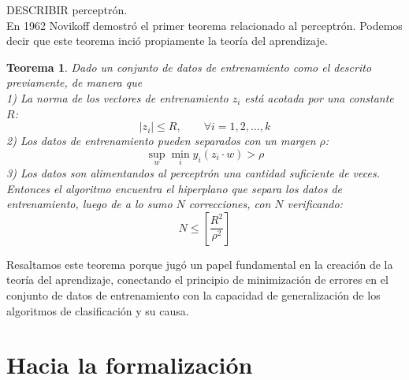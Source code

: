 \documentclass{article}
\newtheorem{thm}{Teorema}[subsection]
\begin{document}
DESCRIBIR perceptrón.\\

En 1962 Novikoff demostró el primer teorema relacionado al perceptrón. Podemos decir que este teorema inció propiamente la teoría del aprendizaje.

\begin{thm}
Dado un conjunto de datos de entrenamiento como el descrito previamente, de manera que\\
1) La norma de los vectores de entrenamiento $z_i$ está acotada por una constante $R$:
$$
|z_i| \leq R, \qquad \forall i=1,2,\dots,k
$$
2) Los datos de entrenamiento pueden separados con un margen $\rho$:
$$
\sup_{w} \min_{i} y_i(z_i\cdot w) > \rho
$$
3) Los datos son alimentandos al perceptrón una cantidad \textit{suficiente} de veces.\\

Entonces el algoritmo encuentra el hiperplano que separa los datos de entrenamiento, luego de a lo
sumo $N$ correcciones, con $N$ verificando:
$$
N \leq \left [ \frac{R^2}{\rho^2}\right ]
$$

\end{thm}

Resaltamos este teorema porque jugó un papel fundamental en la creación de la teoría del aprendizaje, conectando el
principio de minimización de errores en el conjunto de datos de entrenamiento con la capacidad de generalización
de los algoritmos de clasificación y su causa.

\section{Hacia la formalización}
\end{document}
